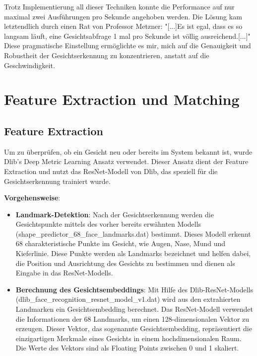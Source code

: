 Trotz Implementierung all dieser Techniken konnte die Performance auf nur maximal zwei Ausführungen pro Sekunde angehoben werden. Die Lösung kam letztendlich durch einen Rat von Professor Metzner: "[...]Es ist egal, dass es so langsam läuft, eine Gesichtsabfrage 1 mal pro Sekunde ist völlig ausreichend.[...]" Diese pragmatische Einstellung ermöglichte es mir, mich auf die Genauigkeit und Robustheit der Gesichtserkennung zu konzentrieren, anstatt auf die Geschwindigkeit.


\section{Feature Extraction und Matching}

\subsection{Feature Extraction}
Um zu überprüfen, ob ein Gesicht neu oder bereits im System bekannt ist, wurde Dlib's Deep Metric Learning Ansatz verwendet. Dieser Ansatz dient der Feature Extraction und nutzt das ResNet-Modell von Dlib, das speziell für die Gesichtserkennung trainiert wurde.

\textbf{Vorgehensweise}:
\begin{itemize}
    \item \textbf{Landmark-Detektion}: Nach der Gesichtserkennung werden die Gesichtspunkte mittels des vorher bereits erwähnten Modells (shape\_predictor\_68\_face\_landmarks.dat) bestimmt. Dieses Modell erkennt 68 charakteristische Punkte im Gesicht, wie Augen, Nase, Mund und Kieferlinie. Diese Punkte werden als Landmarks bezeichnet und helfen dabei, die Position und Ausrichtung des Gesichts zu bestimmen und dienen als Eingabe in das ResNet-Modells.
    
    \item \textbf{Berechnung des Gesichtsembeddings}: Mit Hilfe des Dlib-ResNet-Modells (dlib\_face\_recognition\_resnet\_model\_v1.dat) wird aus den extrahierten Landmarken ein Gesichtsembedding berechnet. Das ResNet-Modell verwendet die Informationen der 68 Landmarks, um einen 128-dimensionalen Vektor zu erzeugen. Dieser Vektor, das sogenannte Gesichtsembedding, repräsentiert die einzigartigen Merkmale eines Gesichts in einem hochdimensionalen Raum. Die Werte des Vektors sind als Floating Points zwischen 0 und 1 skaliert.
\end{itemize}


